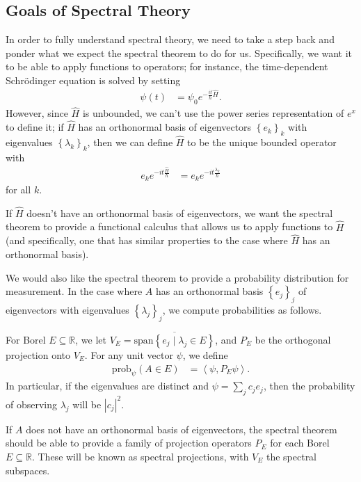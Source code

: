 \documentclass[10pt]{extarticle}
\newcommand{\R}{\mathbb{R}}
\newcommand{\set}[1]{\left\{#1\right\}}
\newcommand{\iprod}[2]{\left\langle #1,#2\right\rangle}
\theoremstyle{plain}
\theoremstyle{definition}
\theoremstyle{remark}
\renewcommand{\newline}{\hfill\break}
\begin{document}
  \subsection{Goals of Spectral Theory}%
  In order to fully understand spectral theory, we need to take a step back and ponder what we expect the spectral theorem to do for us. Specifically, we want it to be able to apply functions to operators; for instance, the time-dependent Schrödinger equation is solved by setting
  \begin{align*}
    \psi(t) &= \psi_0e^{-\frac{it}{\hbar}\hat{H}}.
  \end{align*}
  However, since $\hat{H}$ is unbounded, we can't use the power series representation of $e^{x}$ to define it; if $\hat{H}$ has an orthonormal basis of eigenvectors $\set{e_k}_{k}$ with eigenvalues $\set{\lambda_k}_k$, then we can define $\hat{H}$ to be the unique bounded operator with
  \begin{align*}
    e_ke^{-it\frac{\hat{H}}{\hbar}} &= e_ke^{-it\frac{\lambda_k}{\hbar}}
  \end{align*}
  for all $k$.\newline

  If $\hat{H}$ doesn't have an orthonormal basis of eigenvectors, we want the spectral theorem to provide a functional calculus that allows us to apply functions to $\hat{H}$ (and specifically, one that has similar properties to the case where $\hat{H}$ has an orthonormal basis).\newline

  We would also like the spectral theorem to provide a probability distribution for measurement. In the case where $A$ has an orthonormal basis $\set{e_j}_j$ of eigenvectors with eigenvalues $\set{\lambda_j}_j$, we compute probabilities as follows. \newline

  For Borel $E\subseteq \R$, we let $V_E = \overline{\text{span}\set{e_j\mid \lambda_j\in E}}$, and $P_E$ be the orthogonal projection onto $V_E$. For any unit vector $\psi$, we define
  \begin{align*}
    \text{prob}_{\psi}(A\in E) &= \iprod{\psi}{P_E\psi}.
  \end{align*}
  In particular, if the eigenvalues are distinct and $\psi = \sum_{j}c_je_j$, then the probability of observing $\lambda_j$ will be $|c_j|^2$.\newline

  If $A$ does not have an orthonormal basis of eigenvectors, the spectral theorem should be able to provide a family of projection operators $P_E$ for each Borel $E\subseteq \R$. These will be known as spectral projections, with $V_E$ the spectral subspaces.\newline
\end{document}
